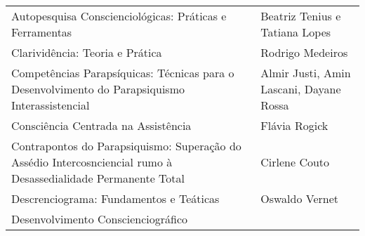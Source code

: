 \documentclass[
]{article}
\begin{document}
\begin{longtable}[]{@{}
  >{\raggedright\arraybackslash}p{}
  >{\raggedright\arraybackslash}p{}@{}}
\begin{minipage}[b]{\linewidth}\raggedright
Autopesquisa Conscienciológicas: Práticas e Ferramentas
\end{minipage} & \begin{minipage}[b]{\linewidth}\raggedright
Beatriz Tenius e Tatiana Lopes
\end{minipage} \\
\begin{minipage}[b]{\linewidth}\raggedright
Clarividência: Teoria e Prática
\end{minipage} & \begin{minipage}[b]{\linewidth}\raggedright
Rodrigo Medeiros
\end{minipage} \\
\begin{minipage}[b]{\linewidth}\raggedright
Competências Parapsíquicas: Técnicas para o Desenvolvimento do Parapsiquismo Interassistencial
\end{minipage} & \begin{minipage}[b]{\linewidth}\raggedright
Almir Justi, Amin Lascani, Dayane Rossa
\end{minipage} \\
\begin{minipage}[b]{\linewidth}\raggedright
Consciência Centrada na Assistência
\end{minipage} & \begin{minipage}[b]{\linewidth}\raggedright
Flávia Rogick
\end{minipage} \\
\begin{minipage}[b]{\linewidth}\raggedright
Contrapontos do Parapsiquismo: Superação do Assédio Intercosnciencial rumo à Desassedialidade Permanente Total
\end{minipage} & \begin{minipage}[b]{\linewidth}\raggedright
Cirlene Couto
\end{minipage} \\
\begin{minipage}[b]{\linewidth}\raggedright
Descrenciograma: Fundamentos e Teáticas
\end{minipage} & \begin{minipage}[b]{\linewidth}\raggedright
Oswaldo Vernet
\end{minipage} \\
\begin{minipage}[b]{\linewidth}\raggedright
Desenvolvimento Conscienciográfico
\end{minipage} & \begin{minipage}[b]{\linewidth}\raggedright

\end{minipage}
\end{longtable}
\end{document}
